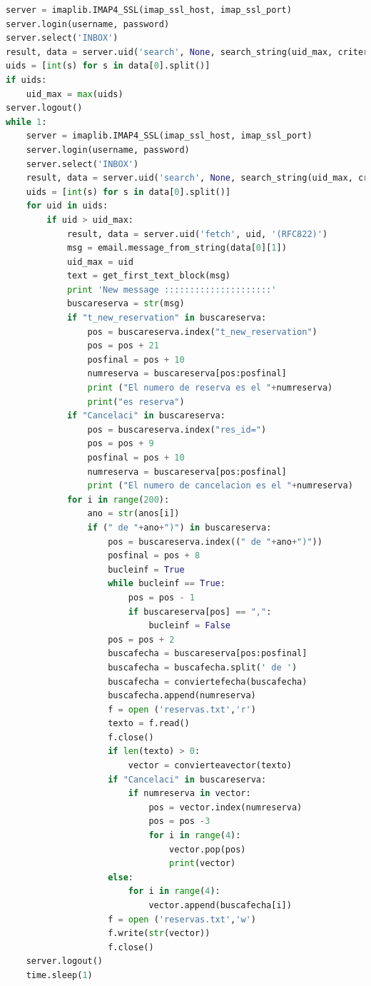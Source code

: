 \begin{lstlisting}[language=Python,
    caption={Recepción de reservas y cancelaciones},
    label=src:recepcion-de-reservas-y-cancelaciones
]
server = imaplib.IMAP4_SSL(imap_ssl_host, imap_ssl_port)
server.login(username, password)
server.select('INBOX')
result, data = server.uid('search', None, search_string(uid_max, criterios-busqueda))
uids = [int(s) for s in data[0].split()]
if uids:
    uid_max = max(uids)
server.logout()
while 1:
    server = imaplib.IMAP4_SSL(imap_ssl_host, imap_ssl_port)
    server.login(username, password)
    server.select('INBOX')
    result, data = server.uid('search', None, search_string(uid_max, criterios-busqueda))
    uids = [int(s) for s in data[0].split()]
    for uid in uids:
        if uid > uid_max:
            result, data = server.uid('fetch', uid, '(RFC822)')
            msg = email.message_from_string(data[0][1])            
            uid_max = uid     
            text = get_first_text_block(msg)
            print 'New message :::::::::::::::::::::'
            buscareserva = str(msg)
            if "t_new_reservation" in buscareserva:                
                pos = buscareserva.index("t_new_reservation")
                pos = pos + 21
                posfinal = pos + 10
                numreserva = buscareserva[pos:posfinal]
                print ("El numero de reserva es el "+numreserva)
                print("es reserva")
            if "Cancelaci" in buscareserva:
                pos = buscareserva.index("res_id=")
                pos = pos + 9
                posfinal = pos + 10
                numreserva = buscareserva[pos:posfinal]
                print ("El numero de cancelacion es el "+numreserva)
            for i in range(200):
                ano = str(anos[i])
                if (" de "+ano+")") in buscareserva:
                    pos = buscareserva.index((" de "+ano+")"))
                    posfinal = pos + 8
                    bucleinf = True
                    while bucleinf == True:
                        pos = pos - 1
                        if buscareserva[pos] == ",":
                            bucleinf = False
                    pos = pos + 2
                    buscafecha = buscareserva[pos:posfinal]
                    buscafecha = buscafecha.split(' de ')
                    buscafecha = conviertefecha(buscafecha)
                    buscafecha.append(numreserva)
                    f = open ('reservas.txt','r')
                    texto = f.read()
                    f.close()
                    if len(texto) > 0:
                        vector = convierteavector(texto)
                    if "Cancelaci" in buscareserva:
                        if numreserva in vector:
                            pos = vector.index(numreserva)
                            pos = pos -3
                            for i in range(4):
                                vector.pop(pos)
                                print(vector)
                    else:
                        for i in range(4):
                            vector.append(buscafecha[i])
                    f = open ('reservas.txt','w')
                    f.write(str(vector))
                    f.close()          
    server.logout()
    time.sleep(1)
\end{lstlisting}
